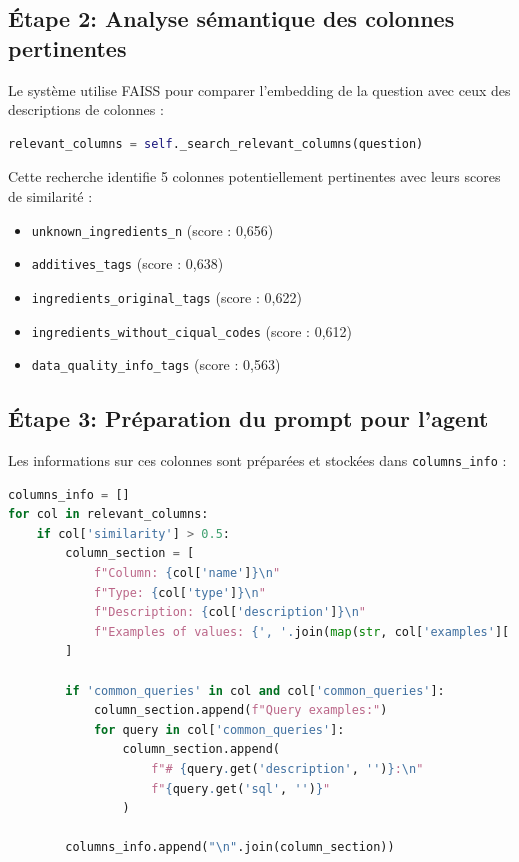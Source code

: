 \documentclass[a4paper,11pt]{article}
\begin{document}
\subsection*{Étape 2: Analyse sémantique des colonnes pertinentes}

Le système utilise FAISS pour comparer l'embedding de la question avec ceux des descriptions de colonnes :

\begin{lstlisting}[language=Python, caption=Recherche sémantique des colonnes pertinentes]
relevant_columns = self._search_relevant_columns(question)
\end{lstlisting}

Cette recherche identifie 5 colonnes potentiellement pertinentes avec leurs scores de similarité :
\begin{itemize}
  \item \texttt{unknown\_ingredients\_n} (score : 0,656)
  \item \texttt{additives\_tags} (score : 0,638)
  \item \texttt{ingredients\_original\_tags} (score : 0,622)
  \item \texttt{ingredients\_without\_ciqual\_codes} (score : 0,612)
  \item \texttt{data\_quality\_info\_tags} (score : 0,563)
\end{itemize}

\newpage
\subsection*{Étape 3: Préparation du prompt pour l'agent}

Les informations sur ces colonnes sont préparées et stockées dans \texttt{columns\_info} :

\begin{lstlisting}[language=Python, caption=Préparation des informations sur les colonnes pertinentes]
columns_info = []
for col in relevant_columns:
    if col['similarity'] > 0.5:
        column_section = [
            f"Column: {col['name']}\n"
            f"Type: {col['type']}\n"
            f"Description: {col['description']}\n"
            f"Examples of values: {', '.join(map(str, col['examples'][:3]))}"
        ]
        
        if 'common_queries' in col and col['common_queries']:
            column_section.append(f"Query examples:")
            for query in col['common_queries']:
                column_section.append(
                    f"# {query.get('description', '')}:\n"
                    f"{query.get('sql', '')}"
                )
        
        columns_info.append("\n".join(column_section))
\end{lstlisting}
\end{document}
